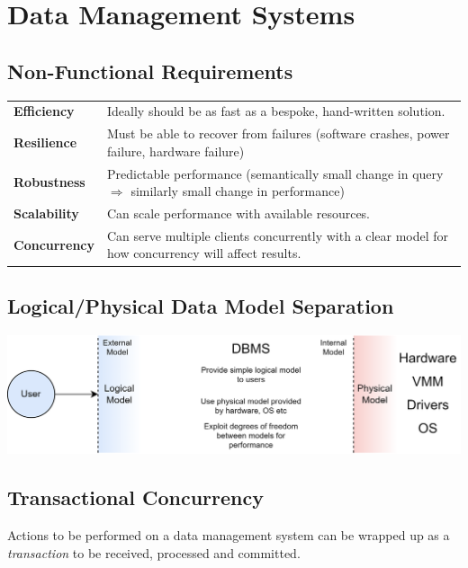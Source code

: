 \section{Data Management Systems}
\subsection{Non-Functional Requirements}
\begin{center}
    \begin{tabular}{l p{}}
        \textbf{Efficiency}  & Ideally should be as fast as a bespoke, hand-written solution. \\
        \textbf{Resilience}  & Must be able to recover from failures (software crashes, power failure, hardware failure) \\
        \textbf{Robustness}  & Predictable performance (semantically small change in query $\Rightarrow$ similarly small change in performance) \\
        \textbf{Scalability} & Can scale performance with available resources. \\
        \textbf{Concurrency} & Can serve multiple clients concurrently with a clear model for how concurrency will affect results. \\
    \end{tabular}
\end{center}

\subsection{Logical/Physical Data Model Separation}
\begin{center}
    \includegraphics[width=.8\textwidth]{introduction/images/model_separation.drawio.png}
\end{center}

\subsection{Transactional Concurrency}

Actions to be performed on a data management system can be wrapped up as a \textit{transaction} to be received, processed and committed.


